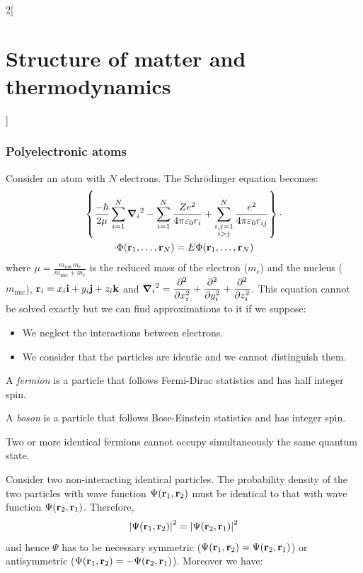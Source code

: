 \documentclass[../../../main.tex]{subfiles}
\begin{document}
\begin{multicols}{2}[\section{Structure of matter and thermodynamics}]
    \subsubsection*{Polyelectronic atoms}
    \begin{prop}
        Consider an atom with $N$ electrons. The Schrödinger equation becomes:
        \begin{multline*}
            \left\{\frac{-\hbar}{2\mu}\sum_{i=1}^N{\grad_i}^2-\sum_{i=1}^N\frac{Ze^2}{4\pi\varepsilon_0r_i}+\sum_{\substack{i,j=1\\i>j}}^N\frac{e^2}{4\pi\varepsilon_0r_{ij}}\right\}\cdot\\\cdot\Phi(\boldsymbol{\mathrm{r}}_1,\ldots,\boldsymbol{\mathrm{r}}_N)=E\Phi(\boldsymbol{\mathrm{r}}_1,\ldots,\boldsymbol{\mathrm{r}}_N)
        \end{multline*}
        where $\displaystyle\mu=\frac{m_\text{nuc}m_e}{m_\text{nuc}+m_e}$ is the reduced mass of the electron ($m_e$) and the nucleus ($m_\text{nuc}$), $\boldsymbol{\mathrm{r}}_i=x_i\boldsymbol{\mathrm{i}}+y_i\boldsymbol{\mathrm{j}}+z_i\boldsymbol{\mathrm{k}}$ and $\displaystyle{\grad_i}^2=\pdv[2]{}{x_i}+\pdv[2]{}{y_i}+\pdv[2]{}{z_i}$.
        This equation cannot be solved exactly but we can find approximations to it if we suppose:
        \begin{itemize}
            \item We neglect the interactions between electrons.
            \item We consider that the particles are identic and we cannot distinguish them.
        \end{itemize}
    \end{prop}
    \begin{definition}[Fermions]
        A \textit{fermion} is a particle that follows Fermi-Dirac statistics and has half integer spin.
    \end{definition}
    \begin{definition}[Boson]
        A \textit{boson} is a particle that follows Bose-Einstein statistics and has integer spin.
    \end{definition}
    \begin{prop}
        Two or more identical fermions cannot occupy simultaneously the same quantum state.
    \end{prop}
    \begin{prop}
        Consider two non-interacting identical particles. The probability density of the two particles with wave function $\Psi(\boldsymbol{\mathrm{r}}_1,\boldsymbol{\mathrm{r}}_2)$ must be identical to that with wave function $\Psi(\boldsymbol{\mathrm{r}}_2,\boldsymbol{\mathrm{r}}_1)$. Therefore, $${|\Psi(\boldsymbol{\mathrm{r}}_1,\boldsymbol{\mathrm{r}}_2)|}^2={|\Psi(\boldsymbol{\mathrm{r}}_2,\boldsymbol{\mathrm{r}}_1)|}^2$$ and hence $\Psi$ has to be necessary symmetric ($\Psi(\boldsymbol{\mathrm{r}}_1,\boldsymbol{\mathrm{r}}_2)=\Psi(\boldsymbol{\mathrm{r}}_2,\boldsymbol{\mathrm{r}}_1)$) or antisymmetric ($\Psi(\boldsymbol{\mathrm{r}}_1,\boldsymbol{\mathrm{r}}_2)=-\Psi(\boldsymbol{\mathrm{r}}_2,\boldsymbol{\mathrm{r}}_1)$). Moreover we have:

\end{prop}
\end{multicols}
\end{document}
